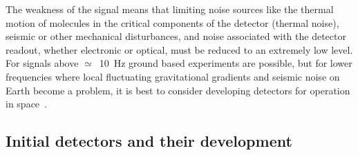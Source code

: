 \documentclass{article}
\begin{document}

The weakness of the signal means that limiting noise sources like the thermal
motion of molecules in the critical components of the detector (thermal noise),
seismic or other mechanical disturbances, and noise associated with the detector
readout, whether electronic or optical, must be reduced to an extremely low
level. For signals above $\simeq$~10~Hz ground based experiments are possible,
but for lower frequencies where local fluctuating gravitational gradients and
seismic noise on Earth become a problem, it is best to consider developing
detectors for operation in space~\cite{LISA}.


\subsection{Initial detectors and their development}
\label{subsection:initdet}
\end{document}
